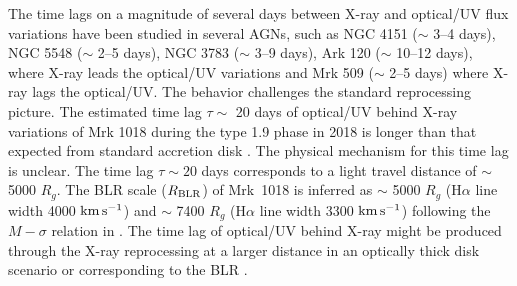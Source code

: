 The time lags on a magnitude of several days between X-ray and optical/UV flux variations have been studied in several AGNs, such as NGC 4151 ($\sim$ 3--4 days), NGC 5548 ($\sim$ 2--5 days), NGC 3783 ($\sim$ 3--9 days), Ark 120 ($\sim$ 10--12 days), \citep[e.g. ][]{2009MNRAS.397.2004A,2017ApJ...840...41E,2019ApJ...870..123E,2020MNRAS.494.1165L} where X-ray leads the optical/UV variations and Mrk 509 ($\sim$ 2--5 days) \citep[e.g. ][]{2019ApJ...870..123E} where X-ray lags the optical/UV. The behavior challenges the standard reprocessing picture. The estimated time lag $\tau \sim$ 20 days of optical/UV behind X-ray variations of Mrk 1018 during the type 1.9 phase in 2018 is longer than that expected from standard accretion disk \citep[see also][]{2018ApJ...854..107F,2020MNRAS.494.1165L}. The physical mechanism for this time lag is unclear.  The time lag $\tau \sim 20$ days corresponds to a light travel distance of $\sim$ 5000 $R_g$. The BLR scale ($R_{\rm{BLR}}$) of Mrk~1018 is inferred as $\sim$ 5000 $R_g$ (H$\alpha$ line width 4000 $\rm{km}\, \rm{s}^{-1}$) and $\sim$ 7400 $R_g$ (H$\alpha$ line width 3300 $\rm{km}\, \rm{s}^{-1}$) \citep[see ][]{2016A&A...593L...8M} following the $M-\sigma$ relation in \citet[][]{2015ApJ...801...38W}. The time lag of optical/UV behind X-ray might be produced through the X-ray reprocessing at a larger distance in an optically thick disk scenario or corresponding to the BLR \citep[e.g.][]{2009MNRAS.397.2004A}.

 
